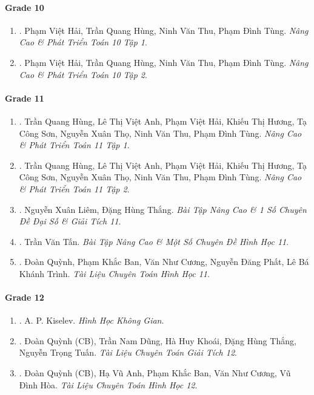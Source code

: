 \documentclass{article}
\begin{document}
\paragraph{Grade 10}

\begin{enumerate}
	\item \cite{Hai_Hung_Thu_Tung2022_tap_1}. Phạm Việt Hải, Trần Quang Hùng, Ninh Văn Thu, Phạm Đình Tùng. {\it Nâng Cao \& Phát Triển Toán 10 Tập 1}.
	\item \cite{Hai_Hung_Thu_Tung2022_tap_2}. Phạm Việt Hải, Trần Quang Hùng, Ninh Văn Thu, Phạm Đình Tùng. {\it Nâng Cao \& Phát Triển Toán 10 Tập 2}.
\end{enumerate}

\paragraph{Grade 11}

\begin{enumerate}
	\item \cite{Hung_nang_cao_phat_trien_Toan_11_tap_1}. Trần Quang Hùng, Lê Thị Việt Anh, Phạm Việt Hải, Khiếu Thị Hương, Tạ Công Sơn, Nguyễn Xuân Thọ, Ninh Văn Thu, Phạm Đình Tùng. {\it Nâng Cao \& Phát Triển Toán 11 Tập 1}.\hfill{\sf[reading]}
	\item \cite{Hung_nang_cao_phat_trien_Toan_11_tap_2}. Trần Quang Hùng, Lê Thị Việt Anh, Phạm Việt Hải, Khiếu Thị Hương, Tạ Công Sơn, Nguyễn Xuân Thọ, Ninh Văn Thu, Phạm Đình Tùng. {\it Nâng Cao \& Phát Triển Toán 11 Tập 2}.\hfill{\sf[reading]}
	\item \cite{Liem_Thang2020}. Nguyễn Xuân Liêm, Đặng Hùng Thắng. {\it Bài Tập Nâng Cao \& 1 Số Chuyên Đề Đại Số \& Giải Tích 11}.\hfill{\sf[reading]}
	\item \cite{Tan2017}. Trần Văn Tấn. {\it Bài Tập Nâng Cao \& Một Số Chuyên Đề Hình Học 11}.\hfill{\sf[reading]}
	\item \cite{TLCT_hinh_hoc_11}. Đoàn Quỳnh, Phạm Khắc Ban, Văn Như Cương, Nguyễn Đăng Phất, Lê Bá Khánh Trình. {\it Tài Liệu Chuyên Toán Hình Học 11}.\hfill{\sf[reading]}	
\end{enumerate}

\paragraph{Grade 12}

\begin{enumerate}
	\item \cite{Kiselev_hhkg}. A. P. Kiselev. {\it Hình Học Không Gian}.\hfill{\sf[reading]}
	\item \cite{TLCT_giai_tich_12}. Đoàn Quỳnh (CB), Trần Nam Dũng, Hà Huy Khoái, Đặng Hùng Thắng, Nguyễn Trọng Tuấn. {\it Tài Liệu Chuyên Toán Giải Tích 12}.\hfill{\sf[reading]}
	\item \cite{TLCT_hinh_hoc_12}. Đoàn Quỳnh (CB), Hạ Vũ Anh, Phạm Khắc Ban, Văn Như Cương, Vũ Đình Hòa. {\it Tài Liệu Chuyên Toán Hình Học 12}.\hfill{\sf[reading]}
\end{enumerate}
\end{document}
